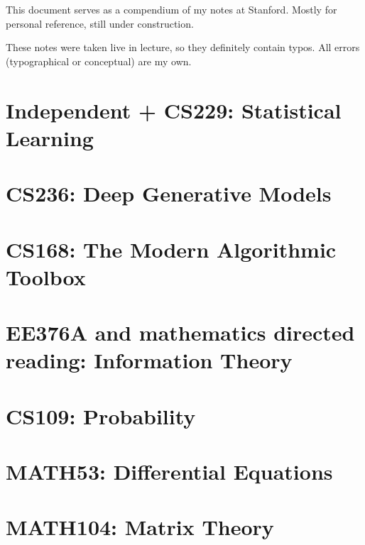 \maketitle

This document serves as a compendium of my notes at Stanford.  Mostly for personal reference, still under construction.

These notes were taken live in lecture, so they definitely contain typos.  All errors (typographical or conceptual) are my own.

\tableofcontents

\mainmatter

\chapter{Independent + CS229: Statistical Learning}

\chapter{CS236: Deep Generative Models}

\chapter{CS168: The Modern Algorithmic Toolbox}

\chapter{EE376A and mathematics directed reading: Information Theory}

\chapter{CS109: Probability}


\chapter{MATH53: Differential Equations}



\chapter{MATH104: Matrix Theory}


